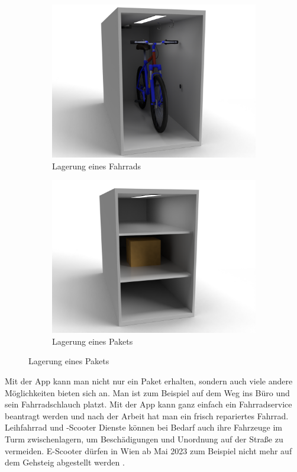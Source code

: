 \begin{figure}[H]
  \centering
  \begin{subfigure}{0.4\textwidth}
    \centering
    \includegraphics[width=\textwidth]{images/box_bike.png}
    \caption{Lagerung eines Fahrrads}
    \label{fig:storing_bike}
  \end{subfigure}
  \begin{subfigure}{0.4\textwidth}
    \centering
    \includegraphics[width=\textwidth]{images/box_item.png}
    \caption{Lagerung eines Pakets}
    \label{fig:storing_item}
  \end{subfigure}
\end{figure}

\noindent Mit der App kann man nicht nur ein Paket erhalten, sondern auch viele andere Möglichkeiten bieten sich an. Man ist zum Beispiel auf dem Weg ins Büro und sein Fahrradschlauch platzt. Mit der App kann ganz einfach ein Fahrradservice beantragt werden und nach der Arbeit hat man ein frisch repariertes Fahrrad. Leihfahrrad und -Scooter Dienste können bei Bedarf auch ihre Fahrzeuge im Turm zwischenlagern, um Beschädigungen und Unordnung auf der Straße zu vermeiden. E-Scooter dürfen in Wien ab Mai 2023 zum Beispiel nicht mehr auf dem Gehsteig abgestellt werden .